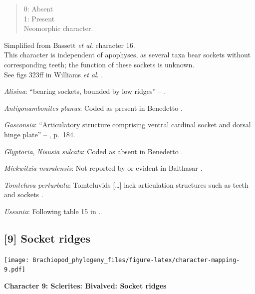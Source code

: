 \documentclass[openany]{book}
\theoremstyle{definition}
\theoremstyle{definition}
\theoremstyle{definition}
\theoremstyle{remark}
\begin{document}
\begin{quote}
0: Absent\\
1: Present\\
Neomorphic character.
\end{quote}

Simplified from Bassett \emph{et al}.
\citeyearpar{Bassett2001Functionalmorphology} character 16.\\
This character is independent of apophyses, as several taxa bear sockets
without corresponding teeth; the function of these sockets is unknown.\\
See figs 323ff in Williams \emph{et al}.
\citeyearpar{Williams1997Introduction}.

\hypertarget{Alisina-coding-8}{}
\emph{Alisina}: ``bearing sockets, bounded by low ridges'' --
\citet{Williams2000LinguliformeaCraniiformea}.

\hypertarget{Antigonambonites_planus-coding-8}{}
\emph{Antigonambonites planus}: Coded as present in Benedetto
\citeyearpar{Benedetto2009iChaniella}.

\hypertarget{Gasconsia-coding-8}{}
\emph{Gasconsia}: ``Articulatory structure comprising ventral cardinal
socket and dorsal hinge plate'' --
\citet{Williams2000LinguliformeaCraniiformea}, p.~184.

\hypertarget{Glyptoria-coding-8}{}
\emph{Glyptoria}, \emph{Nisusia sulcata}: Coded as absent in Benedetto
\citeyearpar{Benedetto2009iChaniella}.

\hypertarget{Mickwitzia_muralensis-coding-8}{}
\emph{Mickwitzia muralensis}: Not reported by or evident in Balthasar
\citeyearpar{Balthasar2004Shellstructure}.

\hypertarget{Tomteluva_perturbata-coding-8}{}
\emph{Tomteluva perturbata}: Tomteluvids {[}\ldots{}{]} lack
articulation structures such as teeth and sockets
\citep{Streng2016Anew}.

\hypertarget{Ussunia-coding-8}{}
\emph{Ussunia}: Following table 15 in
\citet{Williams2000LinguliformeaCraniiformea}.

\subsection*{{[}9{]} Socket ridges}\label{socket-ridges}

\texttt{[image: Brachiopod\_phylogeny\_files/figure-latex/character-mapping-9.pdf]}

\textbf{Character 9: Sclerites: Bivalved: Socket ridges}
\end{document}
